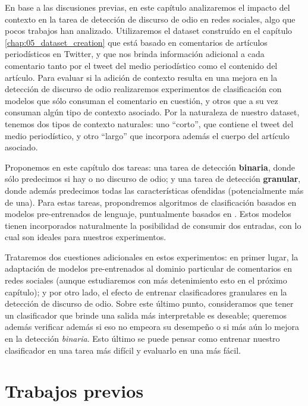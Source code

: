 \label{chap:06_contextualized_hate_speech}
En base a las discusiones previas, en este capítulo analizaremos el impacto del contexto en la tarea de detección de discurso de odio en redes sociales, algo que pocos trabajos han analizado. Utilizaremos el dataset construído en el capítulo \ref{chap:05_dataset_creation} que está basado en comentarios de artículos periodísticos en Twitter, y que nos brinda información adicional a cada comentario tanto por el tweet del medio periodístico como el contenido del artículo. Para evaluar si la adición de contexto resulta en una mejora en la detección de discurso de odio realizaremos experimentos de clasificación con modelos que sólo consuman el comentario en cuestión, y otros que a su vez consuman algún tipo de contexto asociado. Por la naturaleza de nuestro dataset, tenemos dos tipos de contexto naturales: uno ``corto'', que contiene el tweet del medio periodístico, y otro ``largo'' que incorpora además el cuerpo del artículo asociado.

Proponemos en este capítulo dos tareas: una tarea de detección \textbf{binaria}, donde sólo predecimos si hay o no discurso de odio; y una tarea de detección \textbf{granular}, donde además predecimos todas las características ofendidas (potencialmente más de una). Para estas tareas, propondremos algoritmos de clasificación basados en modelos pre-entrenados de lenguaje, puntualmente basados en \beto{}. Estos modelos tienen incorporados naturalmente la posibilidad de consumir dos entradas, con lo cual son ideales para nuestros experimentos.

Trataremos dos cuestiones adicionales en estos experimentos: en primer lugar, la adaptación de modelos pre-entrenados al dominio particular de comentarios en redes sociales (aunque estudiaremos con más detenimiento esto en el próximo capítulo); y por otro lado, el efecto de entrenar clasificadores granulares en la detección de discurso de odio. Sobre este último punto, consideramos que tener un clasificador que brinde una salida más interpretable es deseable; queremos además verificar además si eso no empeora su desempeño o si más aún lo mejora en la detección \emph{binaria}. Esto último se puede pensar como entrenar nuestro clasificador en una tarea más difícil y evaluarlo en una más fácil.

\section{Trabajos previos}
\label{sec:06_classification_previous}

